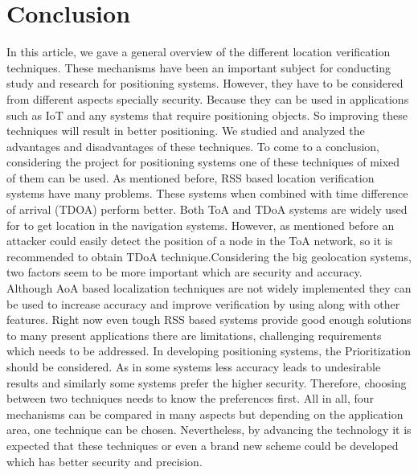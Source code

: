 \documentclass[conference]{IEEEtran}
\begin{document}
\section{Conclusion}
In this article, we gave a general overview of the different location verification techniques. These mechanisms have been an important subject for conducting study and research for positioning systems. However, they have to be considered from different aspects specially security. Because they can be used in applications such as IoT and any systems that require positioning objects. So improving these techniques will result in better positioning. We studied and analyzed the advantages and disadvantages of these techniques. To come to a conclusion, considering the project for positioning systems one of these techniques of mixed of them can be used. 
As mentioned before, RSS based location verification systems have many problems. These systems when combined with time difference of arrival (TDOA) perform better. Both ToA and TDoA systems are widely used for to get location in the navigation systems. However, as mentioned before an attacker could easily detect the position of a node in the ToA network, so it is recommended to obtain TDoA technique.Considering the big geolocation systems, two factors seem to be more important which are security and accuracy. Although AoA based localization techniques are not widely implemented they can be used to increase accuracy and improve verification by using along with other features. Right now even tough RSS based systems provide good enough solutions to many present applications there are limitations, challenging requirements which needs to be addressed.
In developing positioning systems, the Prioritization should be considered. As in some systems less accuracy leads to undesirable results and similarly some systems prefer the higher security. Therefore, choosing between two techniques needs to know the preferences first. All in all, four mechanisms can be compared in many aspects but depending on the application area, one technique can be chosen. Nevertheless, by advancing the technology it is expected that these techniques or even a brand new scheme could be developed which has better security and precision.
\end{document}

